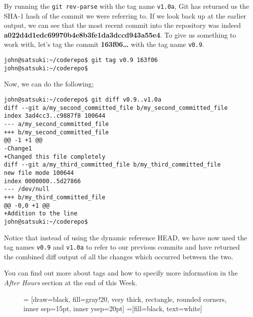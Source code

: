 By running the \texttt{git rev-parse} with the tag name \texttt{v1.0a}, Git has returned us the SHA-1 hash of the commit we were referring to.  If we look back up at the earlier output, we can see that the most recent commit into the repository was indeed \textbf{a022d4d1edc69970b4e8b3fe1da3dccd943a55e4}.  To give us something to work with, let's tag the commit \textbf{163f06\ldots} with the tag name \texttt{v0.9}.

\begin{Verbatim}[frame=leftline,framerule=1mm,fontsize=\relsize{-3}] 
john@satsuki:~/coderepo$ git tag v0.9 163f06
john@satsuki:~/coderepo$ 
\end{Verbatim}

Now, we can do the following;

\begin{Verbatim}[frame=leftline,framerule=1mm,fontsize=\relsize{-3}] 
john@satsuki:~/coderepo$ git diff v0.9..v1.0a
diff --git a/my_second_committed_file b/my_second_committed_file
index 3ad4cc3..c9887f8 100644
--- a/my_second_committed_file
+++ b/my_second_committed_file
@@ -1 +1 @@
-Change1
+Changed this file completely
diff --git a/my_third_committed_file b/my_third_committed_file
new file mode 100644
index 0000000..5d27866
--- /dev/null
+++ b/my_third_committed_file
@@ -0,0 +1 @@
+Addition to the line
john@satsuki:~/coderepo$ 
\end{Verbatim}

Notice that instead of using the dynamic reference HEAD, we have now used the tag names \texttt{v0.9} and \texttt{v1.0a} to refer to our previous commits and have returned the combined diff output of all the changes which occurred between the two.

You can find out more about tags and how to specify more information in the \emph{After Hours} section at the end of this Week.

\begin{figure}[hbt]
 = [draw=black, fill=gray!20, very thick, rectangle, rounded corners, inner sep=15pt, inner ysep=20pt]
 =[fill=black, text=white]
\end{figure}

